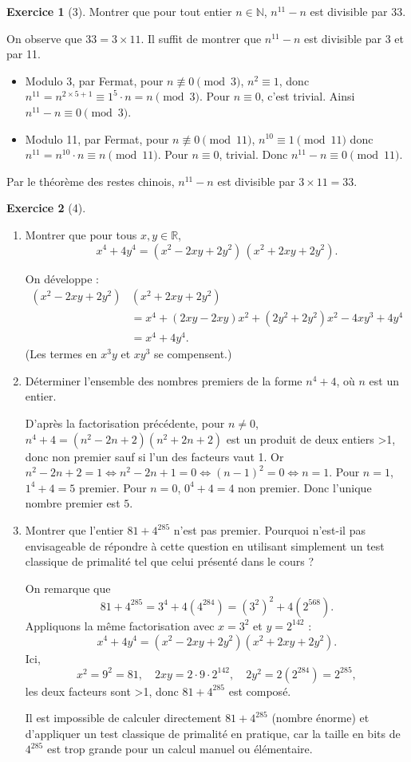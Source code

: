 \documentclass{article}
\theoremstyle{definition}
\newtheorem{exercice}{Exercice}
\begin{document}
\begin{exercice}[3]
Montrer que pour tout entier $n\in\mathbb{N}$, $n^{11}-n$ est divisible par 33.

On observe que $33=3\times11$. Il suffit de montrer que $n^{11}-n$ est divisible par 3 et par 11.
\begin{itemize}
  \item Modulo 3, par Fermat, pour $n\not\equiv0\pmod3$, $n^2\equiv1$, donc $n^{11}=n^{2\times5+1}\equiv1^5\cdot n=n\pmod3$. Pour $n\equiv0$, c'est trivial. Ainsi $n^{11}-n\equiv0\pmod3$.
  \item Modulo 11, par Fermat, pour $n\not\equiv0\pmod{11}$, $n^{10}\equiv1\pmod{11}$ donc $n^{11}=n^{10}\cdot n\equiv n\pmod{11}$. Pour $n\equiv0$, trivial. Donc $n^{11}-n\equiv0\pmod{11}$.
\end{itemize}
Par le théorème des restes chinois, $n^{11}-n$ est divisible par $3\times11=33$.
\end{exercice}

\begin{exercice}[4]
\begin{enumerate}
 \item Montrer que pour tous $x,y\in\mathbb{R}$,
 \[x^4+4y^4=(x^2-2xy+2y^2)\,(x^2+2xy+2y^2).\]

On développe :
\begin{align*}
(x^2-2xy+2y^2)&(x^2+2xy+2y^2)\\
&=x^4+(2xy-2xy)x^2+(2y^2+2y^2)x^2 -4x y^3+4y^4\\
&=x^4+4y^4.
\end{align*}
(Les termes en $x^3y$ et $xy^3$ se compensent.)

 \item Déterminer l'ensemble des nombres premiers de la forme $n^4+4$, où $n$ est un entier.

 D'après la factorisation précédente, pour $n\ne0$, $n^4+4=(n^2-2n+2)(n^2+2n+2)$ est un produit de deux entiers >1, donc non premier sauf si l'un des facteurs vaut 1. Or $n^2-2n+2=1\iff n^2-2n+1=0\iff(n-1)^2=0\iff n=1$. Pour $n=1$, $1^4+4=5$ premier. Pour $n=0$, $0^4+4=4$ non premier. Donc l'unique nombre premier est $5$.

 \item Montrer que l'entier $81+4^{285}$ n'est pas premier. Pourquoi n'est-il pas envisageable de répondre à cette question en utilisant simplement un test classique de primalité tel que celui présenté dans le cours ?

 On remarque que
 \[81+4^{285}=3^4+4(4^{284})=(3^2)^2+4(2^{568}).\]
 Appliquons la même factorisation avec $x=3^2$ et $y=2^{142}$ :
 \[x^4+4y^4=(x^2-2xy+2y^2)(x^2+2xy+2y^2).\]
 Ici,
 \[x^2=9^2=81,\quad2xy=2\cdot9\cdot2^{142},\quad2y^2=2(2^{284})=2^{285},\]
 les deux facteurs sont >1, donc $81+4^{285}$ est composé.

 Il est impossible de calculer directement $81+4^{285}$ (nombre énorme) et d'appliquer un test classique de primalité en pratique, car la taille en bits de $4^{285}$ est trop grande pour un calcul manuel ou élémentaire.
\end{enumerate}
\end{exercice}
\end{document}
